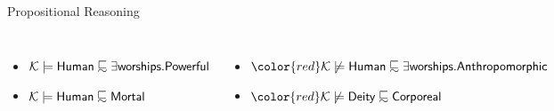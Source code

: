 \documentclass[10pt, xcolor=dvipsnames]{beamer}
\begin{document}
\begin{frame}{Propositional Reasoning}
{ 
  }

  \medskip 

  \begin{columns}[t,onlytextwidth]

  {\footnotesize
  \begin{itemize}
    \item $\Kmc \models \dlFont{Human} \definc \exists \dlFont{worships}.\dlFont{Powerful}$
    \item $\Kmc \models \dlFont{Human} \definc \dlFont{Mortal}$
  \end{itemize}
  }
\pause
  {\footnotesize
  \begin{itemize}
    \item $\color{red} \Kmc \not\models \dlFont{Human} \definc \exists \dlFont{worships}.\dlFont{Anthropomorphic}$
    \item $\color{red} \Kmc \not\models \dlFont{Deity} \definc \dlFont{Corporeal}$
  \end{itemize}
  }

\end{columns}
\end{frame}
\end{document}
